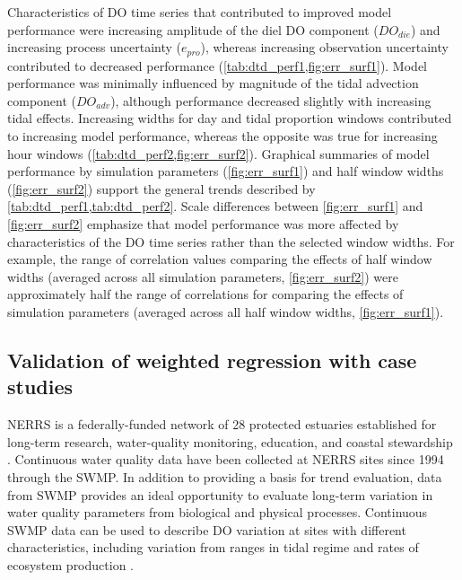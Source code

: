 \documentclass[letterpaper,12pt,oneside]{article}\usepackage[]{graphicx}\usepackage[]{color}
\begin{document}
Characteristics of \ac{DO} time series that contributed to improved model performance were increasing amplitude of the diel \ac{DO} component ($DO_{die}$) and increasing process uncertainty ($e_{pro}$), whereas increasing observation uncertainty contributed to decreased performance (\cref{tab:dtd_perf1,fig:err_surf1}).  Model performance was minimally influenced by magnitude of the tidal advection component ($DO_{adv}$), although performance decreased slightly with increasing tidal effects.  Increasing widths for day and tidal proportion windows contributed to increasing model performance, whereas the opposite was true for increasing hour windows (\cref{tab:dtd_perf2,fig:err_surf2}).  Graphical summaries of model performance by simulation parameters (\cref{fig:err_surf1}) and half window widths (\cref{fig:err_surf2}) support the general trends described by \cref{tab:dtd_perf1,tab:dtd_perf2}.  Scale differences between \cref{fig:err_surf1} and \cref{fig:err_surf2} emphasize that model performance was more affected by characteristics of the \ac{DO} time series rather than the selected window widths.  For example, the range of correlation values comparing the effects of half window widths (averaged across all simulation parameters, \cref{fig:err_surf2}) were approximately half the range of correlations for comparing the effects of simulation parameters (averaged across all half window widths, \cref{fig:err_surf1}).
 
\subsection{Validation of weighted regression with case studies}

\ac{NERRS} is a federally-funded network of 28 protected estuaries established for long-term research, water-quality monitoring, education, and coastal stewardship \citep{Wenner04}.  Continuous water quality data have been collected at \ac{NERRS} sites since 1994 through the \ac{SWMP}.  In addition to providing a basis for trend evaluation, data from \ac{SWMP} provides an ideal opportunity to evaluate long-term variation in water quality parameters from biological and physical processes.  Continuous \ac{SWMP} data can be used to describe \ac{DO} variation at sites with different characteristics, including variation from ranges in tidal regime \citep{Sanger02} and rates of ecosystem production \citep{Caffrey03,Caffrey04}.  
\end{document}

